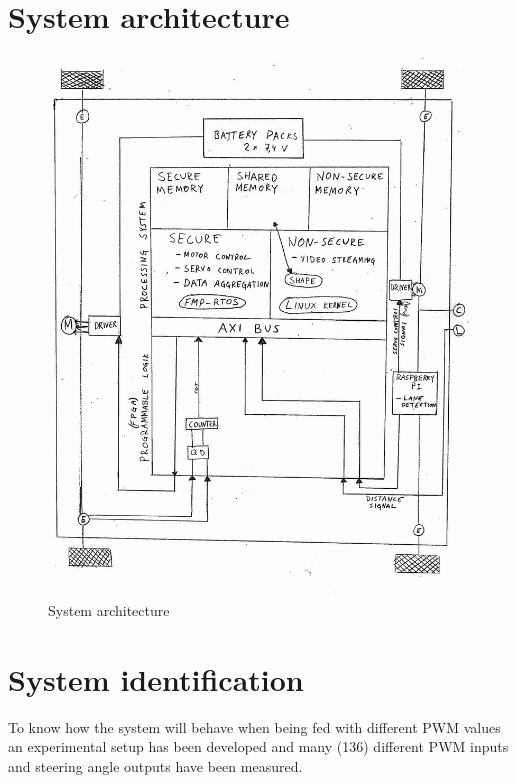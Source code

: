 \section{System architecture}

\begin{figure}[H]
  \includegraphics[width=\textwidth]{./img/archi.png}
  \centering
  \caption{System architecture}
  \label{fig:System architecture}
\end{figure}


\section{System identification}
To know how the system will behave when being fed with different PWM values an experimental setup has been developed and many (136) different PWM inputs and steering angle outputs have been measured.


